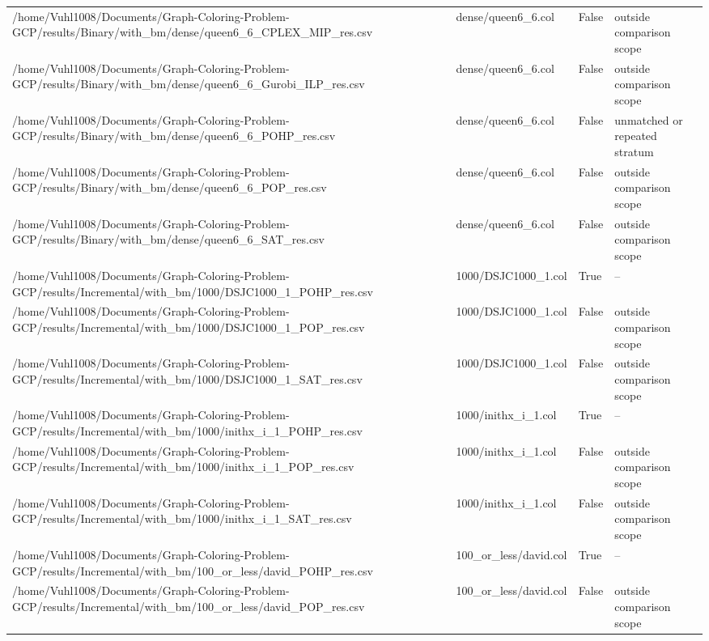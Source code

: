 \begin{table}[htbp]
\begin{tabular}{llll}
/home/Vuhl1008/Documents/Graph-Coloring-Problem-GCP/results/Binary/with\_bm/dense/queen6\_6\_CPLEX\_MIP\_res.csv & dense/queen6\_6.col & False & outside comparison scope \\
/home/Vuhl1008/Documents/Graph-Coloring-Problem-GCP/results/Binary/with\_bm/dense/queen6\_6\_Gurobi\_ILP\_res.csv & dense/queen6\_6.col & False & outside comparison scope \\
/home/Vuhl1008/Documents/Graph-Coloring-Problem-GCP/results/Binary/with\_bm/dense/queen6\_6\_POHP\_res.csv & dense/queen6\_6.col & False & unmatched or repeated stratum \\
/home/Vuhl1008/Documents/Graph-Coloring-Problem-GCP/results/Binary/with\_bm/dense/queen6\_6\_POP\_res.csv & dense/queen6\_6.col & False & outside comparison scope \\
/home/Vuhl1008/Documents/Graph-Coloring-Problem-GCP/results/Binary/with\_bm/dense/queen6\_6\_SAT\_res.csv & dense/queen6\_6.col & False & outside comparison scope \\
/home/Vuhl1008/Documents/Graph-Coloring-Problem-GCP/results/Incremental/with\_bm/1000/DSJC1000\_1\_POHP\_res.csv & 1000/DSJC1000\_1.col & True & -- \\
/home/Vuhl1008/Documents/Graph-Coloring-Problem-GCP/results/Incremental/with\_bm/1000/DSJC1000\_1\_POP\_res.csv & 1000/DSJC1000\_1.col & False & outside comparison scope \\
/home/Vuhl1008/Documents/Graph-Coloring-Problem-GCP/results/Incremental/with\_bm/1000/DSJC1000\_1\_SAT\_res.csv & 1000/DSJC1000\_1.col & False & outside comparison scope \\
/home/Vuhl1008/Documents/Graph-Coloring-Problem-GCP/results/Incremental/with\_bm/1000/inithx\_i\_1\_POHP\_res.csv & 1000/inithx\_i\_1.col & True & -- \\
/home/Vuhl1008/Documents/Graph-Coloring-Problem-GCP/results/Incremental/with\_bm/1000/inithx\_i\_1\_POP\_res.csv & 1000/inithx\_i\_1.col & False & outside comparison scope \\
/home/Vuhl1008/Documents/Graph-Coloring-Problem-GCP/results/Incremental/with\_bm/1000/inithx\_i\_1\_SAT\_res.csv & 1000/inithx\_i\_1.col & False & outside comparison scope \\
/home/Vuhl1008/Documents/Graph-Coloring-Problem-GCP/results/Incremental/with\_bm/100\_or\_less/david\_POHP\_res.csv & 100\_or\_less/david.col & True & -- \\
/home/Vuhl1008/Documents/Graph-Coloring-Problem-GCP/results/Incremental/with\_bm/100\_or\_less/david\_POP\_res.csv & 100\_or\_less/david.col & False & outside comparison scope \\

\end{tabular}
\end{table}
